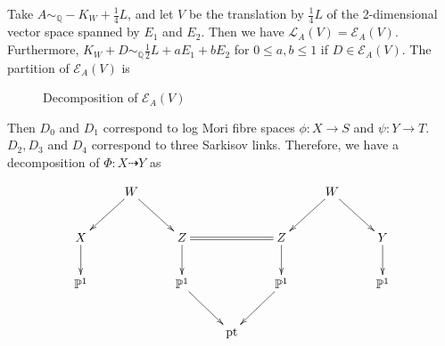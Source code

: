 \documentclass[11pt]{amsart}
\begin{document}
Take $A\sim_{\mathbb{Q}}-K_{W}+\frac{1}{4}L$, and let $V$ be the translation by  $\frac{1}{4}L$ of the 2-dimensional vector space spanned by $E_{1}$ and  $E_{2}$. Then we have $\mathcal{L}_{A}(V)=\mathcal{E}_{A}(V)$. Furthermore,  $K_{W}+D\sim_{\mathbb{Q}} \frac{1}{2}L+aE_{1}+bE_{2}$ for $0\leqslant a,b\leqslant 1$ if $D \in \mathcal{E}_{A}(V)$. The partition of $\mathcal{E}_{A}(V)$ is
\begin{figure}
\centering
    \caption{Decomposition of $\mathcal{E}_A(V)$}
    \label{pic}
\end{figure}
Then $D_{0}$ and $D_{1}$ correspond to log Mori fibre spaces $\phi:X\to S$ and $\psi:Y\to T$. $D_{2},D_{3}$ and $D_{4}$ correspond to three Sarkisov links. Therefore, we have a decomposition of $\Phi: X\dashrightarrow  Y$ as

\[
  \xymatrix{
    &W\ar[ld]\ar[rd] &&&&W\ar[ld]\ar[rd] \\
    X\ar[d]& &Z\ar[d]\ar@{=}[rr]&&Z\ar[d]&&Y\ar[d]\\
    \mathbb{P}^{1}&&\mathbb{P}^{1}\ar[dr]&&\mathbb{P}^{1}\ar[dl]&&\mathbb{P}^{1}\\
    &&&\text{pt}
  }
\]
\end{document}
